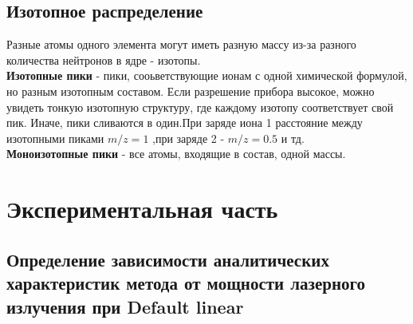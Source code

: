 \documentclass[12pt]{article}
\begin{document}
\begin{flushleft}
\subsection{Изотопное распределение}
Разные атомы одного элемента могут иметь разную массу из-за разного количества нейтронов в ядре - изотопы.\\
\textbf{Изотопные пики} - пики, сооьветствующие ионам с одной химической формулой, но разным изотопным составом. Если разрешение прибора высокое, можно увидеть тонкую изотопную структуру, где каждому изотопу соответствует свой пик. Иначе, пики сливаются в один.При заряде иона 1 расстояние между изотопными пиками $m/z = 1$ ,при заряде 2 - $m/z = 0.5$ и тд.\\
\textbf{Моноизотопные пики} - все атомы, входящие в состав, одной массы.
\section{Экспериментальная часть}
\subsection{Определение зависимости аналитических характеристик метода от мощности лазерного излучения при Default linear}


\end{flushleft}
\end{document}
